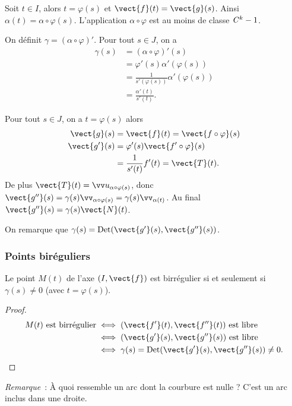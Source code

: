 Soit $t \in I$, alors $t=\varphi(s)$ et $\vect{f}(t) = \vect{g}(s)$. Ainsi $\alpha(t) = \alpha \circ \varphi(s)$. L'application $\alpha \circ \varphi$ est au moins de classe $\mathit{C}^k-1$.

On définit $\gamma=(\alpha \circ \varphi)'$. Pour tout $s \in J$, on a
\begin{align}
  \gamma(s) &=(\alpha \circ \varphi)'(s) \\
  &=\varphi'(s) \alpha'(\varphi(s))\\
  &=\frac{1}{s'(\varphi(s))} \alpha'(\varphi(s))\\
  &=\frac{\alpha'(t)}{s'(t)}.
\end{align}

Pour tout $s \in J$, on a $t=\varphi(s)$ alors
\begin{align}
  \vect{g}(s) &= \vect{f}(t) = \vect{f \circ \varphi}(s) \\
  \vect{g'}(s) &= \varphi'(s) \vect{f' \circ \varphi}(s) \\
  &=\frac{1}{s'(t)} f'(t) =\vect{T}(t).
\end{align}
De plus $\vect{T}(t) = \vu_{\alpha\circ \varphi(s)}$, donc $\vect{g''}(s)=\gamma(s) \vv_{\alpha\circ \varphi(s)}=\gamma(s) \vv_{\alpha(t)}$. Au final $\vect{g''}(s)=\gamma(s) \vect{N}(t)$.

On remarque que $\gamma(s)=\Det(\vect{g'}(s), \vect{g''}(s))$.

\subsubsection{Points biréguliers}

\begin{prop}
  Le point $M(t)$ de l'axe $(I, \vect{f})$ est birrégulier si et seulement si $\gamma(s)\neq 0$ (avec $t=\varphi(s)$).
\end{prop}
\begin{proof}
  \begin{align}
    M(t) \text{~est birrégulier} &\iff (\vect{f'}(t), \vect{f''}(t)) \text{~est libre}\\
    &\iff (\vect{g'}(s), \vect{g''}(s)) \text{~est libre}\\
    &\iff \gamma(s)=\Det(\vect{g'}(s), \vect{g''}(s)) \neq 0.
  \end{align}
\end{proof}

\emph{Remarque}~: À quoi ressemble un arc dont la courbure est nulle ? C'est un arc inclus dans une droite.


